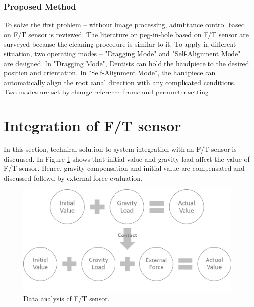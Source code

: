 \subsubsection{Proposed Method}
\hspace*{6mm}To solve the first problem -- without image processing, admittance control based on F/T sensor is reviewed. The literature on peg-in-hole based on F/T sensor  \cite{7743375, pihwithflex, Xu201511, 8294275} are surveyed because the cleaning procedure is similar to it. To apply in different situation, two operating modes -- "Dragging Mode" and "Self-Alignment Mode" are designed. In "Dragging Mode", Dentists can hold the handpiece to the desired position and orientation. In "Self-Alignment Mode", the handpiece can automatically align the root canal direction with any complicated conditions. Two modes are set by change reference frame and parameter setting.
\section{Integration of F/T sensor}
\label{sec:grav compen}
\hspace*{6mm}In this section, technical solution to system integration with an F/T sensor is discuused. In Figure \ref{fig:gravity compensation} shows that initial value and gravity load affect the value of F/T sensor. Hence, gravity compensation and initial value are compensated and discussed followd by external force evaluation.
\begin{figure}[htbp]
\begin{center}
\includegraphics[width=1\linewidth]{Images/gravity compensation.png}
\caption{
Data analysis of F/T sensor.
}\label{fig:gravity compensation}
\end{center}
\end{figure}
